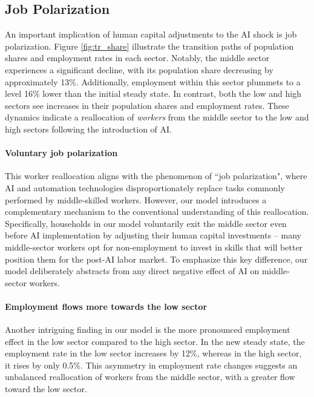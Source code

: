 \documentclass[12pt]{article}
\begin{document}
\subsection{Job Polarization}\label{sec:jobpolar}

An important implication of human capital adjustments to the AI shock is job polarization. 
Figure \ref{fig:tr_share} illustrate the transition paths of population shares and employment rates in each sector. Notably, the middle sector experiences a significant decline, with its population share decreasing by approximately 13\%. Additionally, employment within this sector plummets to a level 16\% lower than the initial steady state. In contrast, both the low and high sectors see increases in their population shares and employment rates. These dynamics indicate a reallocation of \emph{workers} from the middle sector to the low and high sectors following the introduction of AI.

\paragraph{Voluntary job polarization}
This worker reallocation aligns with the phenomenon of ``job polarization"\parencites{Goos2014}, where AI and automation technologies disproportionately replace tasks commonly performed by middle-skilled workers. However, our model introduces a complementary mechanism to the conventional understanding of this reallocation. Specifically, households in our model voluntarily exit the middle sector even before AI implementation by adjusting their human capital investments -- many middle-sector workers opt for non-employment to invest in skills that will better position
them for the post-AI labor market. To emphasize this key difference, our model deliberately abstracts from any direct negative effect of AI on middle-sector workers.

\paragraph{Employment flows more towards the low sector}

Another intriguing finding in our model is the more pronounced employment effect in the low sector compared to the high sector. In the new steady state, the employment rate in the low sector increases by 12\%, whereas in the high sector, it rises by only 0.5\%. This asymmetry in employment rate changes suggests an unbalanced reallocation of workers from the middle sector, with a greater flow toward the low sector.
\end{document}
